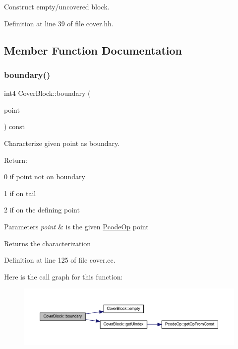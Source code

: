 Construct empty/uncovered block. 



Definition at line 39 of file cover.\+hh.



\subsection{Member Function Documentation}
\mbox{\label{class_cover_block_ad8f60860ed4169e0f574d4e1ebc1b779}} 
\subsubsection{\texorpdfstring{boundary()}{boundary()}}
{\footnotesize\ttfamily int4 Cover\+Block\+::boundary (\begin{DoxyParamCaption}\item[{const \mbox{\hyperlink{class_pcode_op}{Pcode\+Op}} $\ast$}]{point }\end{DoxyParamCaption}) const}



Characterize given point as boundary. 

Return\+:
\begin{DoxyItemize}
\item 0 if point not on boundary
\item 1 if on tail
\item 2 if on the defining point
\end{DoxyItemize}


\begin{DoxyParams}{Parameters}
{\em point} & is the given \mbox{\hyperlink{class_pcode_op}{Pcode\+Op}} point \\
\hline
\end{DoxyParams}
\begin{DoxyReturn}{Returns}
the characterization 
\end{DoxyReturn}


Definition at line 125 of file cover.\+cc.

Here is the call graph for this function\+:
\nopagebreak
\begin{figure}[H]
\begin{center}
\leavevmode
\includegraphics[width=350pt]{class_cover_block_ad8f60860ed4169e0f574d4e1ebc1b779_cgraph}
\end{center}
\end{figure}
\mbox{\label{class_cover_block_a735783c16ee76a3072a541601e01085c}} 
